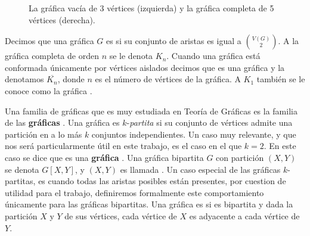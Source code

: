 \begin{figure}[ht!]
    \centering
        \caption{La gr\'afica vac\'ia de 3 v\'ertices (izquierda) y la
        gr\'afica completa de 5 v\'ertices (derecha).}
        \label{fig:ex-vacomp}
    \end{figure}

Decimos que una gr\'afica $G$ es  si su conjunto
de aristas es igual a $\binom{V(G)}{2}$. A la gr\'afica completa de orden $n$ se
le denota $K_n$. Cuando una gr\'afica est\'a conformada \'unicamente por
v\'ertices aislados decimos que es una gr\'afica 
y la denotamos $\overline{K_n}$, donde $n$ es el n\'umero de v\'ertices de la
gr\'afica. A $K_1$ tambi\'en se le conoce como la gr\'afica  .

Una familia de gr\'aficas que es muy estudiada en Teor\'ia de Gr\'aficas es la
familia de las \textbf{gr\'aficas }. Una gr\'afica es
$k$-\textit{partita} si su conjunto de v\'ertices admite una partici\'on en a lo
m\'as $k$ conjuntos independientes. Un caso muy relevante, y que nos ser\'a
particularmente \'util en este trabajo, es el caso en el que $k=2$. En este caso
se dice que es una \textbf{gr\'afica} . Una gr\'afica
bipartita $G$ con partici\'on $(X,Y)$ se denota $G[X,Y]$, y $(X,Y)$ es llamada
. Un caso especial de las gr\'aficas $k$-partitas, es
cuando todas las aristas posibles est\'an presentes, por cuestion de utilidad
para el trabajo, definiremos formalmente este comportamiento \'unicamente para
las gr\'aficas bipartitas. Una gr\'afica es  si es bipartita y dada la partici\'on $X$ y $Y$ de sus v\'ertices,
cada v\'ertice de $X$ es adyacente a cada v\'ertice de $Y$. 

